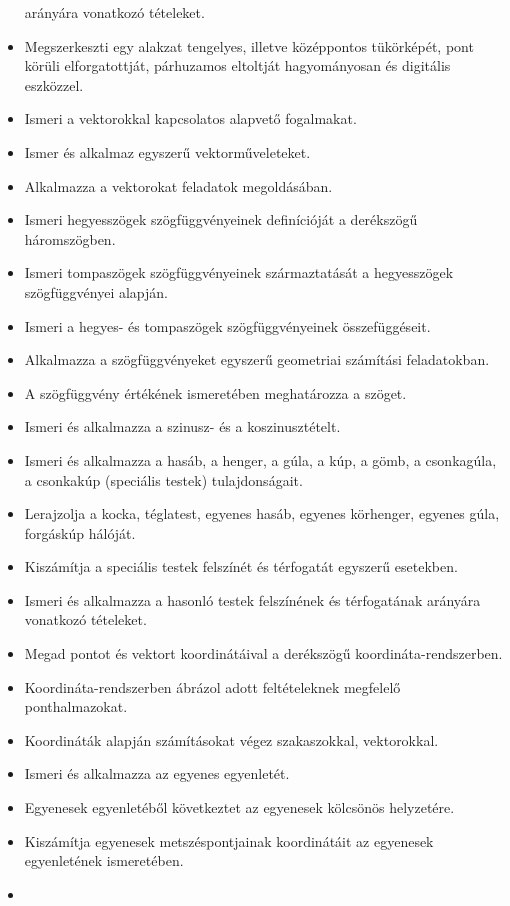\begin{itemize}
  arányára vonatkozó tételeket.
\item
  Megszerkeszti egy alakzat tengelyes, illetve középpontos tükörképét,
  pont körüli elforgatottját, párhuzamos eltoltját hagyományosan és
  digitális eszközzel.
\item
  Ismeri a vektorokkal kapcsolatos alapvető fogalmakat.
\item
  Ismer és alkalmaz egyszerű vektorműveleteket.
\item
  Alkalmazza a vektorokat feladatok megoldásában.
\item
  Ismeri hegyesszögek szögfüggvényeinek definícióját a derékszögű
  háromszögben.
\item
  Ismeri tompaszögek szögfüggvényeinek származtatását a hegyesszögek
  szögfüggvényei alapján.
\item
  Ismeri a hegyes- és tompaszögek szögfüggvényeinek összefüggéseit.
\item
  Alkalmazza a szögfüggvényeket egyszerű geometriai számítási
  feladatokban.
\item
  A szögfüggvény értékének ismeretében meghatározza a szöget.
\item
  Ismeri és alkalmazza a szinusz- és a koszinusztételt.
\item
  Ismeri és alkalmazza a hasáb, a henger, a gúla, a kúp, a gömb, a
  csonkagúla, a csonkakúp (speciális testek) tulajdonságait.
\item
  Lerajzolja a kocka, téglatest, egyenes hasáb, egyenes körhenger,
  egyenes gúla, forgáskúp hálóját.
\item
  Kiszámítja a speciális testek felszínét és térfogatát egyszerű
  esetekben.
\item
  Ismeri és alkalmazza a hasonló testek felszínének és térfogatának
  arányára vonatkozó tételeket.
\item
  Megad pontot és vektort koordinátáival a derékszögű
  koordináta-rendszerben.
\item
  Koordináta-rendszerben ábrázol adott feltételeknek megfelelő
  ponthalmazokat.
\item
  Koordináták alapján számításokat végez szakaszokkal, vektorokkal.
\item
  Ismeri és alkalmazza az egyenes egyenletét.
\item
  Egyenesek egyenletéből következtet az egyenesek kölcsönös helyzetére.
\item
  Kiszámítja egyenesek metszéspontjainak koordinátáit az egyenesek
  egyenletének ismeretében.
\item

\end{itemize}
